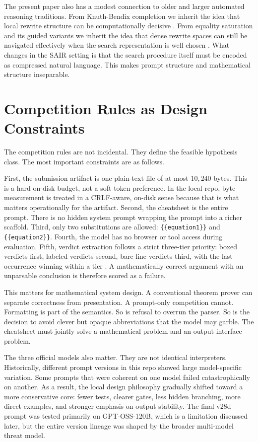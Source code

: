 \documentclass[12pt]{amsart}
\begin{document}
The present paper also has a modest connection to older and larger automated reasoning traditions. From Knuth-Bendix completion we inherit the idea that local rewrite structure can be computationally decisive \cite{knuth-bendix}. From equality saturation and its guided variants we inherit the idea that dense rewrite spaces can still be navigated effectively when the search representation is well chosen \cite{DBLP:journals/pacmpl/WillseyNWFTP21,DBLP:journals/pacmpl/KoehlerGBGTS24}. What changes in the SAIR setting is that the search procedure itself must be encoded as compressed natural language. This makes prompt structure and mathematical structure inseparable.

\section{Competition Rules as Design Constraints}

The competition rules are not incidental. They define the feasible hypothesis class. The most important constraints are as follows.

First, the submission artifact is one plain-text file of at most $10{,}240$ bytes. This is a hard on-disk budget, not a soft token preference. In the local repo, byte measurement is treated in a CRLF-aware, on-disk sense because that is what matters operationally for the artifact. Second, the cheatsheet is the entire prompt. There is no hidden system prompt wrapping the prompt into a richer scaffold. Third, only two substitutions are allowed: \texttt{\{\{equation1\}\}} and \texttt{\{\{equation2\}\}}. Fourth, the model has no browser or tool access during evaluation. Fifth, verdict extraction follows a strict three-tier priority: boxed verdicts first, labeled verdicts second, bare-line verdicts third, with the last occurrence winning within a tier \cite{SAIRJudge2026}. A mathematically correct argument with an unparsable conclusion is therefore scored as a failure.

This matters for mathematical system design. A conventional theorem prover can separate correctness from presentation. A prompt-only competition cannot. Formatting is part of the semantics. So is refusal to overrun the parser. So is the decision to avoid clever but opaque abbreviations that the model may garble. The cheatsheet must jointly solve a mathematical problem and an output-interface problem.

The three official models also matter. They are not identical interpreters. Historically, different prompt versions in this repo showed large model-specific variation. Some prompts that were coherent on one model failed catastrophically on another. As a result, the local design philosophy gradually shifted toward a more conservative core: fewer tests, clearer gates, less hidden branching, more direct examples, and stronger emphasis on output stability. The final v28d prompt was tested primarily on GPT-OSS-120B, which is a limitation discussed later, but the entire version lineage was shaped by the broader multi-model threat model.
\end{document}
